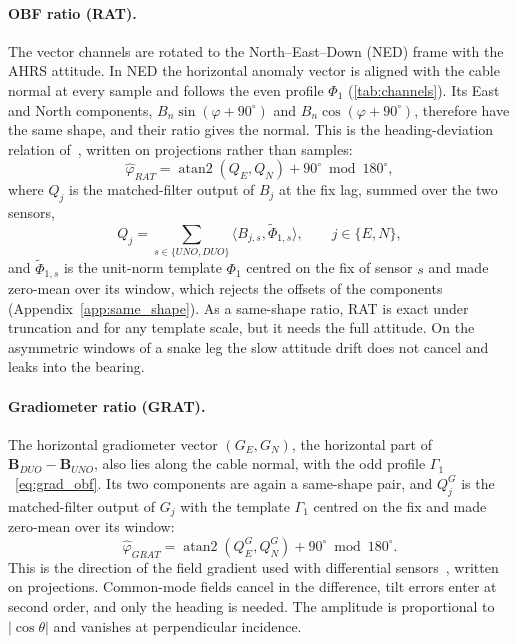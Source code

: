 \paragraph{OBF ratio (RAT).}
The vector channels are rotated to the North--East--Down (NED) frame with the AHRS attitude. In NED the horizontal anomaly vector is aligned with the cable normal at every sample and follows the even profile $\Phi_1$ (\cref{tab:channels}). Its East and North components, $B_n \sin(\varphi + 90^\circ)$ and $B_n \cos(\varphi + 90^\circ)$, therefore have the same shape, and their ratio gives the normal. This is the heading-deviation relation of~\cite{xiang2016subsea,zhang2024electromagnetic}, written on projections rather than samples:
\begin{equation}
\hat{\varphi}_{RAT} = \operatorname{atan2}(Q_E, Q_N) + 90^\circ \bmod 180^\circ,
\label{eq:rat}
\end{equation}
where $Q_j$ is the matched-filter output of $B_j$ at the fix lag, summed over the two sensors,
\begin{equation}
Q_j = \sum_{s \in \{UNO, DUO\}} \langle B_{j,s}, \tilde{\Phi}_{1,s} \rangle, \qquad j \in \{E, N\},
\label{eq:rat_projection}
\end{equation}
and $\tilde{\Phi}_{1,s}$ is the unit-norm template $\Phi_1$ centred on the fix of sensor $s$ and made zero-mean over its window, which rejects the offsets of the components (Appendix~\ref{app:same_shape}). As a same-shape ratio, RAT is exact under truncation and for any template scale, but it needs the full attitude. On the asymmetric windows of a snake leg the slow attitude drift does not cancel and leaks into the bearing.

\paragraph{Gradiometer ratio (GRAT).}
The horizontal gradiometer vector $(G_E, G_N)$, the horizontal part of $\mathbf{B}_{DUO} - \mathbf{B}_{UNO}$, also lies along the cable normal, with the odd profile $\Gamma_1$~\eqref{eq:grad_obf}. Its two components are again a same-shape pair, and $Q^G_j$ is the matched-filter output of $G_j$ with the template $\Gamma_1$ centred on the fix and made zero-mean over its window:
\begin{equation}
\hat{\varphi}_{GRAT} = \operatorname{atan2}(Q^G_E, Q^G_N) + 90^\circ \bmod 180^\circ.
\label{eq:grat}
\end{equation}
This is the direction of the field gradient used with differential sensors~\cite{kdd1998maritime,zeng2023magnetic}, written on projections. Common-mode fields cancel in the difference, tilt errors enter at second order, and only the heading is needed. The amplitude is proportional to $|\cos\theta|$ and vanishes at perpendicular incidence.

